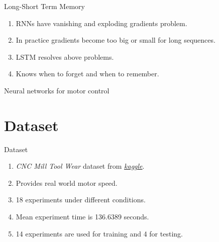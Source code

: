 \documentclass[handout]{beamer}
\begin{document}
\begin{frame}{Long-Short Term Memory}
  \begin{enumerate}
    \item RNNs have vanishing and exploding gradients problem.
    \item In practice gradients become too big or small for long sequences.
    \item LSTM resolves above problems.
    \item Knows when to forget and when to remember.
  \end{enumerate}
\end{frame}

%

\begin{frame}{}
  \center\Large{\color{blue}Neural networks for motor control}
\end{frame}

\section{Dataset}
\begin{frame}{Dataset}
  \begin{enumerate}
    \item \textit{CNC Mill Tool Wear} dataset from \href{https://www.kaggle.com/shasun/tool-wear-detection-in-cnc-mill}{\color{blue}\textit{kaggle}}.
    \item Provides real world motor speed.
    \item 18 experiments under different conditions.
    \item Mean experiment time is 136.6389 seconds.
    \item 14 experiments are used for training and 4 for testing.
  \end{enumerate}
\end{frame}
\end{document}

